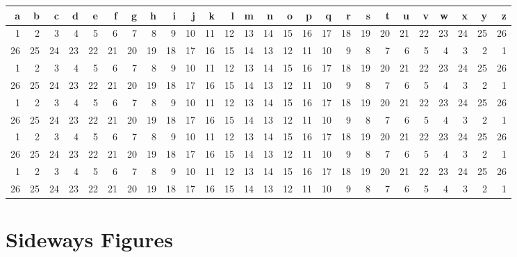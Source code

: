 \begin{sidewaystable}[h]
  \caption{\label{tbl:sidewaysT}A big table that needs to go
   sideways -- easy with \LaTeX.}

  \vspace{2ex}
  \renewcommand{\arraystretch}{1.2}
  \begin{tabular*}{\textwidth}{@{\extracolsep{\fill}}*{26}{r}}
    \hline\hline
    a & b & c & d & e & f & g & h & i & j & k & l & m & n & o &
     p & q & r & s & t & u & v & w & x & y & z
    \\ \hline
    1 & 2 & 3 & 4 & 5 & 6 & 7 & 8 & 9 &
    10 & 11 & 12 & 13 & 14 & 15 & 16 & 17 & 18 & 19 &
    20 & 21 & 22 & 23 & 24 & 25 & 26 \\
    26 & 25 & 24 & 23 & 22 & 21 & 20 &
    19 & 18 & 17 & 16 & 15 & 14 & 13 & 12 & 11 & 10 &
    9 & 8 & 7 & 6 & 5 & 4 & 3 & 2 & 1 \\
    1 & 2 & 3 & 4 & 5 & 6 & 7 & 8 & 9 &
    10 & 11 & 12 & 13 & 14 & 15 & 16 & 17 & 18 & 19 &
    20 & 21 & 22 & 23 & 24 & 25 & 26 \\
    26 & 25 & 24 & 23 & 22 & 21 & 20 &
    19 & 18 & 17 & 16 & 15 & 14 & 13 & 12 & 11 & 10 &
    9 & 8 & 7 & 6 & 5 & 4 & 3 & 2 & 1 \\
    1 & 2 & 3 & 4 & 5 & 6 & 7 & 8 & 9 &
    10 & 11 & 12 & 13 & 14 & 15 & 16 & 17 & 18 & 19 &
    20 & 21 & 22 & 23 & 24 & 25 & 26 \\
    26 & 25 & 24 & 23 & 22 & 21 & 20 &
    19 & 18 & 17 & 16 & 15 & 14 & 13 & 12 & 11 & 10 &
    9 & 8 & 7 & 6 & 5 & 4 & 3 & 2 & 1 \\
    1 & 2 & 3 & 4 & 5 & 6 & 7 & 8 & 9 &
    10 & 11 & 12 & 13 & 14 & 15 & 16 & 17 & 18 & 19 &
    20 & 21 & 22 & 23 & 24 & 25 & 26 \\
    26 & 25 & 24 & 23 & 22 & 21 & 20 &
    19 & 18 & 17 & 16 & 15 & 14 & 13 & 12 & 11 & 10 &
    9 & 8 & 7 & 6 & 5 & 4 & 3 & 2 & 1 \\
    1 & 2 & 3 & 4 & 5 & 6 & 7 & 8 & 9 &
    10 & 11 & 12 & 13 & 14 & 15 & 16 & 17 & 18 & 19 &
    20 & 21 & 22 & 23 & 24 & 25 & 26 \\
    26 & 25 & 24 & 23 & 22 & 21 & 20 &
    19 & 18 & 17 & 16 & 15 & 14 & 13 & 12 & 11 & 10 &
    9 & 8 & 7 & 6 & 5 & 4 & 3 & 2 & 1 \\
    \hline \hline
   \end{tabular*}
\end{sidewaystable}

\section{Sideways Figures}

